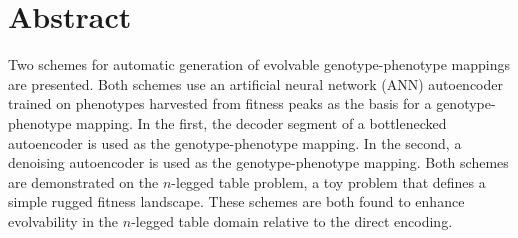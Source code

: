 \section{Abstract} \label{sec:abstract}

Two schemes for automatic generation of evolvable genotype-phenotype mappings are presented.
Both schemes use an artificial neural network (ANN) autoencoder trained on phenotypes harvested from fitness peaks as the basis for a genotype-phenotype mapping.
In the first, the decoder segment of a bottlenecked autoencoder is used as the genotype-phenotype mapping.
In the second, a denoising autoencoder is used as the genotype-phenotype mapping.
Both schemes are demonstrated on the $n$-legged table problem, a toy problem that defines a simple rugged fitness landscape.
These schemes are both found to enhance evolvability in the $n$-legged table domain relative to the direct encoding.
